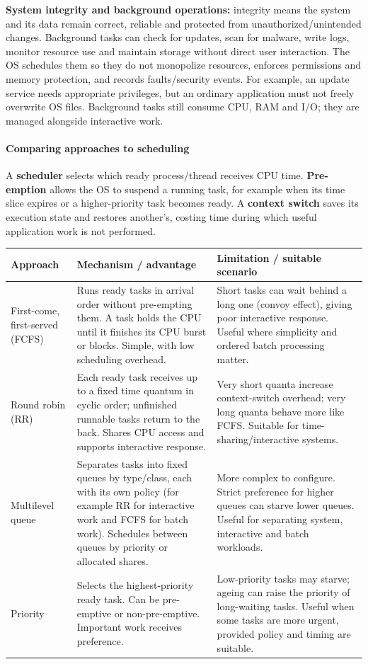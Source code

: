 \documentclass[a4paper,12pt]{article}
\begin{document}
\textbf{System integrity and background operations:} integrity means the system and its data remain correct, reliable and protected from unauthorized/unintended changes. Background tasks can check for updates, scan for malware, write logs, monitor resource use and maintain storage without direct user interaction. The OS schedules them so they do not monopolize resources, enforces permissions and memory protection, and records faults/security events. For example, an update service needs appropriate privileges, but an ordinary application must not freely overwrite OS files. Background tasks still consume CPU, RAM and I/O; they are managed alongside interactive work.

\paragraph{Comparing approaches to scheduling}
A \textbf{scheduler} selects which ready process/thread receives CPU time. \textbf{Pre-emption} allows the OS to suspend a running task, for example when its time slice expires or a higher-priority task becomes ready. A \textbf{context switch} saves its execution state and restores another's, costing time during which useful application work is not performed.
\begin{center}
\begin{tabularx}{0.98\linewidth}{p{2.5cm} X X}
\toprule
\textbf{Approach} & \textbf{Mechanism / advantage} & \textbf{Limitation / suitable scenario} \\
\midrule
First-come, first-served (FCFS) & Runs ready tasks in arrival order without pre-empting them. A task holds the CPU until it finishes its CPU burst or blocks. Simple, with low scheduling overhead. & Short tasks can wait behind a long one (convoy effect), giving poor interactive response. Useful where simplicity and ordered batch processing matter. \\
Round robin (RR) & Each ready task receives up to a fixed time quantum in cyclic order; unfinished runnable tasks return to the back. Shares CPU access and supports interactive response. & Very short quanta increase context-switch overhead; very long quanta behave more like FCFS. Suitable for time-sharing/interactive systems. \\
Multilevel queue & Separates tasks into fixed queues by type/class, each with its own policy (for example RR for interactive work and FCFS for batch work). Schedules between queues by priority or allocated shares. & More complex to configure. Strict preference for higher queues can starve lower queues. Useful for separating system, interactive and batch workloads. \\
Priority & Selects the highest-priority ready task. Can be pre-emptive or non-pre-emptive. Important work receives preference. & Low-priority tasks may starve; ageing can raise the priority of long-waiting tasks. Useful when some tasks are more urgent, provided policy and timing are suitable. \\
\bottomrule
\end{tabularx}
\end{center}
\end{document}
